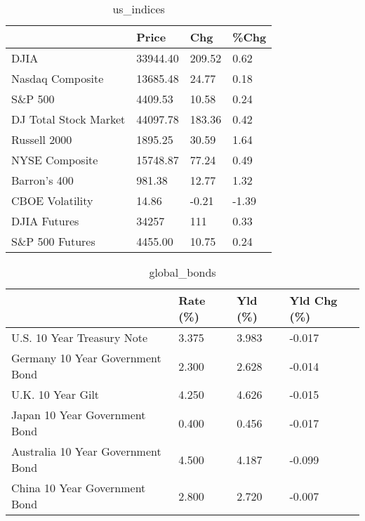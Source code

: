 \documentclass{article}%
\begin{document}
%


\begin{table}[htbp]%
\caption{us\_indices}%
\centering%
\begin{adjustbox}{width=1\textwidth}%
\begin{tabular}{llll}
\toprule
                      &    Price &    Chg &  \%Chg \\
\midrule
                 DJIA & 33944.40 & 209.52 &  0.62 \\
     Nasdaq Composite & 13685.48 &  24.77 &  0.18 \\
              S\&P 500 &  4409.53 &  10.58 &  0.24 \\
DJ Total Stock Market & 44097.78 & 183.36 &  0.42 \\
         Russell 2000 &  1895.25 &  30.59 &  1.64 \\
       NYSE Composite & 15748.87 &  77.24 &  0.49 \\
         Barron's 400 &   981.38 &  12.77 &  1.32 \\
      CBOE Volatility &    14.86 &  -0.21 & -1.39 \\
         DJIA Futures &    34257 &    111 &  0.33 \\
      S\&P 500 Futures &  4455.00 &  10.75 &  0.24 \\
\bottomrule
\end{tabular}
%
\end{adjustbox}%
\end{table}

%


\begin{table}[htbp]%
\caption{global\_bonds}%
\centering%
\begin{adjustbox}{width=1\textwidth}%
\begin{tabular}{llll}
\toprule
                                  & Rate (\%) & Yld (\%) & Yld Chg (\%) \\
\midrule
       U.S. 10 Year Treasury Note &    3.375 &   3.983 &      -0.017 \\
  Germany 10 Year Government Bond &    2.300 &   2.628 &      -0.014 \\
                U.K. 10 Year Gilt &    4.250 &   4.626 &      -0.015 \\
    Japan 10 Year Government Bond &    0.400 &   0.456 &      -0.017 \\
Australia 10 Year Government Bond &    4.500 &   4.187 &      -0.099 \\
    China 10 Year Government Bond &    2.800 &   2.720 &      -0.007 \\
\bottomrule
\end{tabular}
%
\end{adjustbox}%
\end{table}
\end{document}
